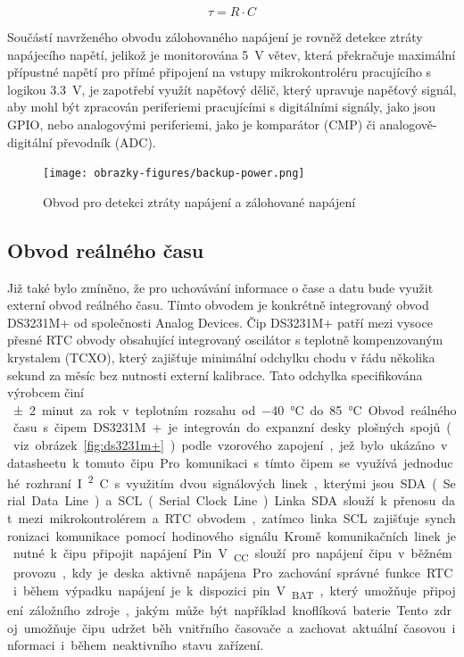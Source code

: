 \[
\tau = R \cdot C
\]

Součástí navrženého obvodu zálohovaného napájení je rovněž detekce ztráty napájecího napětí, jelikož je monitorována \SI{5}{\volt} větev, která překračuje maximální přípustné napětí pro přímé připojení na vstupy mikrokontroléru pracujícího s logikou \SI{3.3}{\volt}, je zapotřebí využít napěťový dělič, který upravuje napěťový signál, aby mohl být zpracován periferiemi pracujícími s digitálními signály, jako jsou GPIO, nebo analogovými periferiemi, jako je komparátor (CMP) či analogově-digitální převodník (ADC).

\begin{figure}[h]
    \centering
    \texttt{[image: obrazky-figures/backup-power.png]}
    
    \caption{Obvod pro detekci ztráty napájení a zálohované napájení}
    \label{fig:backup-power}
\end{figure}

\subsection{Obvod reálného času}
Již také bylo zmíněno, že pro uchovávání informace o čase a datu bude využit externí obvod reálného času. Tímto obvodem je konkrétně integrovaný obvod DS3231M+ od společnosti Analog Devices. Čip DS3231M+ patří mezi vysoce přesné RTC obvody obsahující integrovaný oscilátor s teplotně kompenzovaným krystalem (TCXO), který zajišťuje minimální odchylku chodu v řádu několika sekund za měsíc bez nutnosti externí kalibrace. Tato odchylka specifikována výrobcem činí \SI{\pm2} minut za rok v teplotním rozsahu od \SI{-40}{\degreeCelsius} do \SI{+85}{\degreeCelsius}.

Obvod reálného času s čipem DS3231M+ je integrován do expanzní desky plošných spojů (viz. obrázek \ref{fig:ds3231m+}) podle vzorového zapojení, jež bylo ukázáno v datasheetu k tomuto čipu. Pro komunikaci s tímto čipem se využívá jednoduché rozhraní I\textsuperscript{2}C s využitím dvou signálových linek, kterými jsou SDA (Serial Data Line) a SCL (Serial Clock Line). Linka SDA slouží k přenosu dat mezi mikrokontrolérem a RTC obvodem, zatímco linka SCL zajišťuje synchronizaci komunikace pomocí hodinového signálu. Kromě komunikačních linek je nutné k čipu připojit napájení. Pin V\textsubscript{CC} slouží pro napájení čipu v běžném provozu, kdy je deska aktivně napájena. Pro zachování správné funkce RTC i během výpadku napájení je k dispozici pin V\textsubscript{BAT}, který umožňuje připojení záložního zdroje, jakým může být například knoflíková baterie. Tento zdroj umožňuje čipu udržet běh vnitřního časovače a zachovat aktuální časovou informaci i během neaktivního stavu zařízení. 

